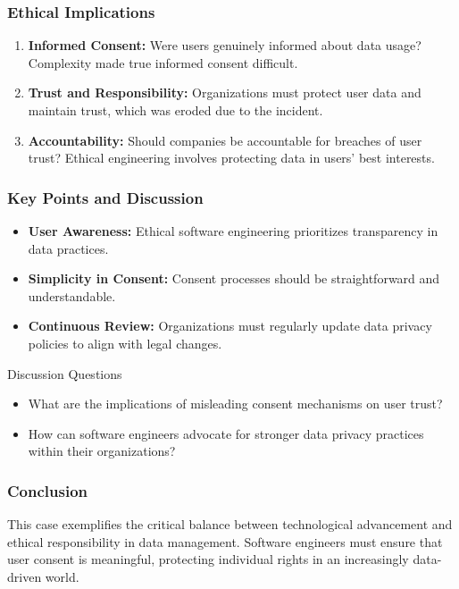 \documentclass{beamer}
\begin{document}
\begin{frame}[fragile]
    \frametitle{Ethical Implications}
    \begin{enumerate}
        \item \textbf{Informed Consent:} Were users genuinely informed about data usage? Complexity made true informed consent difficult.
        \item \textbf{Trust and Responsibility:} Organizations must protect user data and maintain trust, which was eroded due to the incident.
        \item \textbf{Accountability:} Should companies be accountable for breaches of user trust? Ethical engineering involves protecting data in users' best interests.
    \end{enumerate}
\end{frame}

\begin{frame}[fragile]
    \frametitle{Key Points and Discussion}
    \begin{itemize}
        \item \textbf{User Awareness:} Ethical software engineering prioritizes transparency in data practices.
        \item \textbf{Simplicity in Consent:} Consent processes should be straightforward and understandable.
        \item \textbf{Continuous Review:} Organizations must regularly update data privacy policies to align with legal changes.
    \end{itemize}
    
    \begin{block}{Discussion Questions}
        \begin{itemize}
            \item What are the implications of misleading consent mechanisms on user trust?
            \item How can software engineers advocate for stronger data privacy practices within their organizations?
        \end{itemize}
    \end{block}
\end{frame}

\begin{frame}[fragile]
    \frametitle{Conclusion}
    This case exemplifies the critical balance between technological advancement and ethical responsibility in data management. Software engineers must ensure that user consent is meaningful, protecting individual rights in an increasingly data-driven world.
\end{frame}
\end{document}
